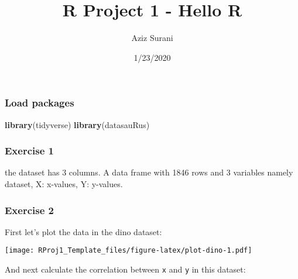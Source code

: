 \documentclass[
]{article}
\title{R Project 1 - Hello R}
\author{Aziz Surani}
\date{1/23/2020}
\newenvironment{Shaded}{\begin{snugshade}}{\end{snugshade}}
\newcommand{\DataTypeTok}[1]{\textcolor[rgb]{0.13,0.29,0.53}{#1}}
\newcommand{\KeywordTok}[1]{\textcolor[rgb]{0.13,0.29,0.53}{\textbf{#1}}}
\newcommand{\NormalTok}[1]{#1}
\newcommand{\OperatorTok}[1]{\textcolor[rgb]{0.81,0.36,0.00}{\textbf{#1}}}
\newcommand{\StringTok}[1]{\textcolor[rgb]{0.31,0.60,0.02}{#1}}
\begin{document}
\maketitle

\hypertarget{load-packages}{%
\subsubsection{Load packages}\label{load-packages}}

\begin{Shaded}
\begin{Highlighting}[]
\KeywordTok{library}\NormalTok{(tidyverse) }
\KeywordTok{library}\NormalTok{(datasauRus)}
\end{Highlighting}
\end{Shaded}

\hypertarget{exercise-1}{%
\subsubsection{Exercise 1}\label{exercise-1}}

the dataset has 3 columns. A data frame with 1846 rows and 3 variables
namely dataset, X: x-values, Y: y-values.

\hypertarget{exercise-2}{%
\subsubsection{Exercise 2}\label{exercise-2}}

First let's plot the data in the dino dataset:

\begin{Shaded}
\end{Shaded}

\texttt{[image: RProj1\_Template\_files/figure-latex/plot-dino-1.pdf]}

And next calculate the correlation between \texttt{x} and \texttt{y} in
this dataset:
\end{document}
